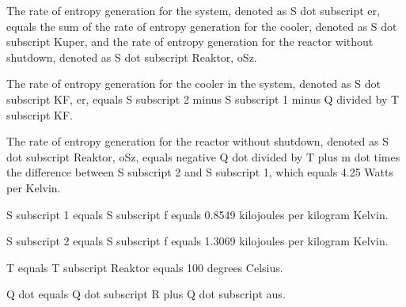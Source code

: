 The rate of entropy generation for the system, denoted as S dot subscript er, equals the sum of the rate of entropy generation for the cooler, denoted as S dot subscript Kuper, and the rate of entropy generation for the reactor without shutdown, denoted as S dot subscript Reaktor, oSz.

The rate of entropy generation for the cooler in the system, denoted as S dot subscript KF, er, equals S subscript 2 minus S subscript 1 minus Q divided by T subscript KF.

The rate of entropy generation for the reactor without shutdown, denoted as S dot subscript Reaktor, oSz, equals negative Q dot divided by T plus m dot times the difference between S subscript 2 and S subscript 1, which equals 4.25 Watts per Kelvin.

S subscript 1 equals S subscript f equals 0.8549 kilojoules per kilogram Kelvin.

S subscript 2 equals S subscript f equals 1.3069 kilojoules per kilogram Kelvin.

T equals T subscript Reaktor equals 100 degrees Celsius.

Q dot equals Q dot subscript R plus Q dot subscript aus.